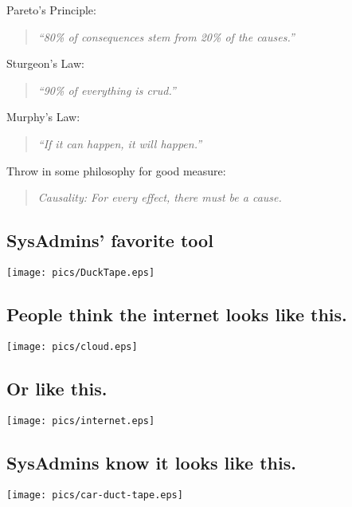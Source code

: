 \documentclass[xga]{xdvislides}
\begin{document}
Pareto's Principle:
\begin{quote}
{\em ``80\% of consequences stem from 20\% of the causes.''}
\end{quote}

Sturgeon's Law:
\begin{quote}
{\em ``90\% of everything is crud.''}
\end{quote}

Murphy's Law:
\begin{quote}
{\em ``If it can happen, it will happen.''}
\end{quote}

Throw in some philosophy for good measure:
\begin{quote}
{\em Causality: For every effect, there must be a cause.}
\end{quote}
\Normalsize

\subsection{SysAdmins' favorite tool}
\begin{center}
	\texttt{[image: pics/DuckTape.eps]}
\end{center}

\subsection{People think the internet looks like this.}
\begin{center}
	\texttt{[image: pics/cloud.eps]}
\end{center}

\subsection{Or like this.}
\begin{center}
	\texttt{[image: pics/internet.eps]}
\end{center}

\subsection{SysAdmins know it looks like this.}
\vspace*{\fill}
\begin{center}
    \texttt{[image: pics/car-duct-tape.eps]}
\end{center}
\vspace*{\fill}
\end{document}
